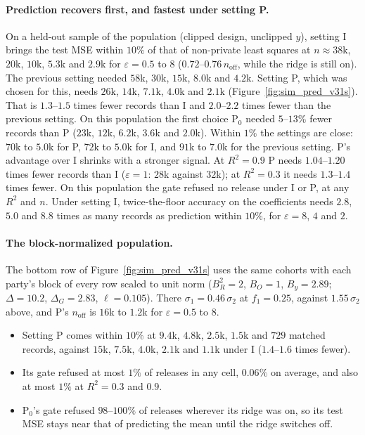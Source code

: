 \documentclass[11pt]{article}
\theoremstyle{definition}
\theoremstyle{plain}
\begin{document}
\paragraph{Prediction recovers first, and fastest under setting P.} On a held-out sample of the population (clipped design, unclipped $y$), setting I brings the test MSE within $10\%$ of that of non-private least squares at $n \approx 38$k, $20$k, $10$k, $5.3$k and $2.9$k for $\varepsilon = 0.5$ to $8$ ($0.72$--$0.76\,n_{\mathrm{off}}$, while the ridge is still on). The previous setting needed $58$k, $30$k, $15$k, $8.0$k and $4.2$k. Setting P, which was chosen for this, needs $26$k, $14$k, $7.1$k, $4.0$k and $2.1$k (Figure~\ref{fig:sim_pred_v31s}). That is $1.3$--$1.5$ times fewer records than I and $2.0$--$2.2$ times fewer than the previous setting. On this population the first choice P$_0$ needed $5$--$13\%$ fewer records than P ($23$k, $12$k, $6.2$k, $3.6$k and $2.0$k). Within $1\%$ the settings are close: $70$k to $5.0$k for P, $72$k to $5.0$k for I, and $91$k to $7.0$k for the previous setting. P's advantage over I shrinks with a stronger signal. At $R^2 = 0.9$ P needs $1.04$--$1.20$ times fewer records than I ($\varepsilon = 1$: $28$k against $32$k); at $R^2 = 0.3$ it needs $1.3$--$1.4$ times fewer. On this population the gate refused no release under I or P, at any $R^2$ and $n$. Under setting I, twice-the-floor accuracy on the coefficients needs $2.8$, $5.0$ and $8.8$ times as many records as prediction within $10\%$, for $\varepsilon = 8$, $4$ and $2$.

\paragraph{The block-normalized population.} The bottom row of Figure~\ref{fig:sim_pred_v31s} uses the same cohorts with each party's block of every row scaled to unit norm ($B_R^2 = 2$, $B_O = 1$, $B_y = 2.89$; $\Delta = 10.2$, $\Delta_G = 2.83$, $\ell = 0.105$). There $\sigma_1 = 0.46\,\sigma_2$ at $f_1 = 0.25$, against $1.55\,\sigma_2$ above, and P's $n_{\mathrm{off}}$ is $16$k to $1.2$k for $\varepsilon = 0.5$ to $8$.
\begin{itemize}[noitemsep]
  \item Setting P comes within $10\%$ at $9.4$k, $4.8$k, $2.5$k, $1.5$k and $729$ matched records, against $15$k, $7.5$k, $4.0$k, $2.1$k and $1.1$k under I ($1.4$--$1.6$ times fewer).
  \item Its gate refused at most $1\%$ of releases in any cell, $0.06\%$ on average, and also at most $1\%$ at $R^2 = 0.3$ and $0.9$.
  \item P$_0$'s gate refused $98$--$100\%$ of releases wherever its ridge was on, so its test MSE stays near that of predicting the mean until the ridge switches off.
\end{itemize}
\end{document}
